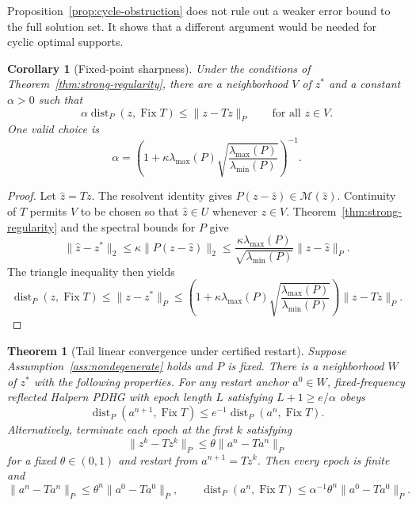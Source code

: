 \documentclass[11pt]{article}
\newtheorem{theorem}{Theorem}
\newtheorem{corollary}{Corollary}
\newcommand{\dist}{\operatorname{dist}}
\newcommand{\Fix}{\operatorname{Fix}}
\begin{document}
Proposition~\ref{prop:cycle-obstruction} does not rule out a weaker error bound to the full solution set.
It shows that a different argument would be needed for cyclic optimal supports.

\begin{corollary}[Fixed-point sharpness]\label{cor:sharpness}
Under the conditions of Theorem~\ref{thm:strong-regularity}, there are a neighborhood $V$ of $z^*$ and a constant $\alpha>0$ such that
$$\alpha\dist_P(z,\Fix T)\leq\lVert z-Tz\rVert_P\qquad\text{for all }z\in V.$$
One valid choice is
$$\alpha=\left(1+\kappa\lambda_{\max}(P)\sqrt{\frac{\lambda_{\max}(P)}{\lambda_{\min}(P)}}\right)^{-1}.$$
\end{corollary}

\begin{proof}
Let $\widehat z=Tz$.
The resolvent identity gives $P(z-\widehat z)\in\mathcal M(\widehat z)$.
Continuity of $T$ permits $V$ to be chosen so that $\widehat z\in U$ whenever $z\in V$.
Theorem~\ref{thm:strong-regularity} and the spectral bounds for $P$ give
$$\lVert\widehat z-z^*\rVert_2\leq\kappa\lVert P(z-\widehat z)\rVert_2\leq\frac{\kappa\lambda_{\max}(P)}{\sqrt{\lambda_{\min}(P)}}\lVert z-\widehat z\rVert_P.$$
The triangle inequality then yields
$$\dist_P(z,\Fix T)\leq\lVert z-z^*\rVert_P\leq\left(1+\kappa\lambda_{\max}(P)\sqrt{\frac{\lambda_{\max}(P)}{\lambda_{\min}(P)}}\right)\lVert z-Tz\rVert_P.$$
\end{proof}

\begin{theorem}[Tail linear convergence under certified restart]\label{thm:restart}
Suppose Assumption~\ref{ass:nondegenerate} holds and $P$ is fixed.
There is a neighborhood $W$ of $z^*$ with the following properties.
For any restart anchor $a^0\in W$, fixed-frequency reflected Halpern PDHG with epoch length $L$ satisfying $L+1\geq e/\alpha$ obeys
$$\dist_P(a^{n+1},\Fix T)\leq e^{-1}\dist_P(a^n,\Fix T).$$
Alternatively, terminate each epoch at the first $k$ satisfying
$$\lVert z^k-Tz^k\rVert_P\leq\theta\lVert a^n-Ta^n\rVert_P$$
for a fixed $\theta\in(0,1)$ and restart from $a^{n+1}=Tz^k$.
Then every epoch is finite and
$$\lVert a^n-Ta^n\rVert_P\leq\theta^n\lVert a^0-Ta^0\rVert_P,\qquad \dist_P(a^n,\Fix T)\leq\alpha^{-1}\theta^n\lVert a^0-Ta^0\rVert_P.$$
\end{theorem}
\end{document}
